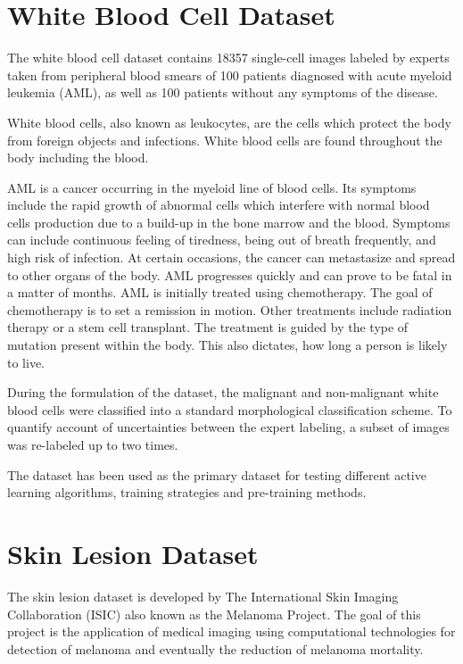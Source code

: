 \section{White Blood Cell Dataset}

The white blood cell dataset contains 18357 single-cell images labeled by experts taken from peripheral blood smears of 100 patients diagnosed with acute myeloid leukemia (AML), as well as 100 patients without any symptoms of the disease. 

White blood cells, also known as leukocytes, are the cells which protect the body from foreign objects and infections. White blood cells are found throughout the body including the blood.

AML is a cancer occurring in the myeloid line of blood cells. Its symptoms include the rapid growth of abnormal cells which interfere with normal blood cells production due to a build-up in the bone marrow and the blood. Symptoms can include continuous feeling of tiredness, being out of breath frequently, and high risk of infection. At certain occasions, the cancer can metastasize and spread to other organs of the body. AML progresses quickly and can prove to be fatal in a matter of months. AML is initially treated using chemotherapy. The goal of chemotherapy is to set a remission in motion. Other treatments include radiation therapy or a stem cell transplant. The treatment is guided by the type of mutation present within the body. This also dictates, how long a person is likely to live.

During the formulation of the dataset, the malignant and non-malignant white blood cells were classified into a standard morphological classification scheme. To quantify account of uncertainties between the expert labeling, a subset of images was re-labeled up to two times.

The dataset has been used as the primary dataset for testing different active learning algorithms, training strategies and pre-training methods.

\section{Skin Lesion Dataset}

The skin lesion dataset is developed by The International Skin Imaging Collaboration (ISIC) also known as the Melanoma Project. The goal of this project is the application of medical imaging using computational technologies for detection of melanoma and eventually the reduction of melanoma mortality.

